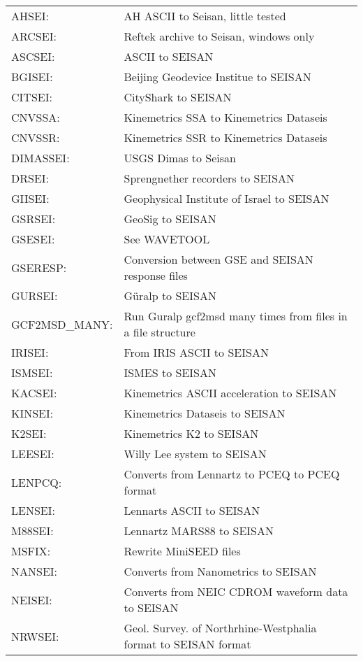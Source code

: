 \begin{tabular}{lp{10cm}}
AHSEI:  & AH ASCII to Seisan, little tested\\
ARCSEI: & Reftek archive to Seisan, windows only \\ %
ASCSEI: & ASCII to SEISAN \\
BGISEI: & Beijing Geodevice Institue to SEISAN \\
CITSEI: & CityShark to SEISAN \\
CNVSSA: & Kinemetrics SSA to Kinemetrics Dataseis \\
CNVSSR: & Kinemetrics SSR to Kinemetrics Dataseis \\
DIMASSEI: & USGS Dimas to Seisan\\
DRSEI: & Sprengnether recorders to SEISAN \\
GIISEI: & Geophysical Institute of Israel to SEISAN \\
GSRSEI: & GeoSig to SEISAN \\
GSESEI: & See WAVETOOL \\
GSERESP: & Conversion between GSE and SEISAN response files \\
GURSEI: & G\"uralp to SEISAN \\
GCF2MSD\_MANY: & Run Guralp gcf2msd many times from files in a file structure \\
IRISEI: & From IRIS ASCII to SEISAN  \\
ISMSEI: & ISMES to SEISAN \\
KACSEI: & Kinemetrics ASCII acceleration to SEISAN \\
KINSEI: & Kinemetrics Dataseis to SEISAN \\
K2SEI: & Kinemetrics K2 to SEISAN \\
LEESEI: & Willy Lee system to SEISAN \\
LENPCQ: & Converts from Lennartz to PCEQ to PCEQ format \\
LENSEI: & Lennarts ASCII to SEISAN \\
M88SEI: & Lennartz MARS88 to SEISAN \\
MSFIX: & Rewrite MiniSEED files \\
NANSEI: & Converts from Nanometrics to SEISAN  \\
NEISEI: & Converts from NEIC CDROM waveform data to SEISAN \\
NRWSEI: & Geol. Survey. of Northrhine-Westphalia format to SEISAN format\index{NRWSEI}\index{Norhtrhine-Westphalia} \\

\end{tabular}
